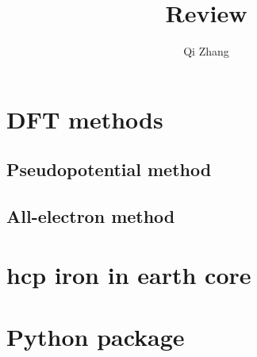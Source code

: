 \documentclass[12pt]{article}
\title{Review}		%
\author{Qi Zhang}								%
\date{}										%
\begin{document}

\tableofcontents
\listoffigures
\listoftables
\newpage

\section{DFT methods}
\subsection{Pseudopotential method}






\subsection{All-electron method}


\section{hcp iron in earth core}





\section{Python package}



\end{document}
